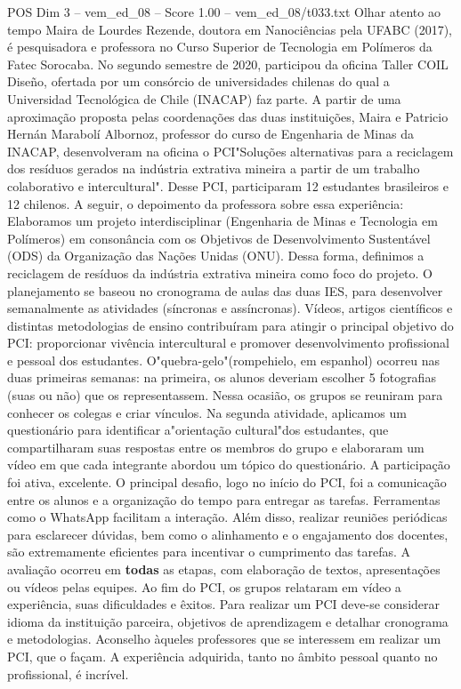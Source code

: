 \begin{textsample}{POS Dim 3 – vem\_ed\_08 – Score 1.00 – vem\_ed\_08/t033.txt}  \label{ex:f3_pos_012}
Olhar atento ao tempo Maira de Lourdes Rezende, doutora em Nanociências pela UFABC (2017), é pesquisadora e professora no Curso Superior de Tecnologia em Polímeros da Fatec Sorocaba.
No segundo semestre de 2020, participou da oficina Taller COIL Diseño, ofertada por um consórcio de universidades chilenas do qual a Universidad Tecnológica de Chile (INACAP) faz parte.
A partir de uma aproximação proposta pelas coordenações das duas instituições, Maira e Patricio Hernán Marabolí Albornoz, professor do curso de Engenharia de Minas da INACAP, desenvolveram na oficina o PCI"Soluções alternativas para a reciclagem dos resíduos gerados na indústria extrativa mineira a partir de um trabalho colaborativo e intercultural".
Desse PCI, participaram 12 estudantes brasileiros e 12 chilenos.
A seguir, o depoimento da professora sobre essa experiência: Elaboramos um projeto interdisciplinar (Engenharia de Minas e Tecnologia em Polímeros) em consonância com os Objetivos de Desenvolvimento Sustentável (ODS) da Organização das Nações Unidas (ONU).
Dessa forma, definimos a reciclagem de resíduos da indústria extrativa mineira como foco do projeto.
O planejamento se baseou no cronograma de aulas das duas IES, para desenvolver semanalmente as atividades (síncronas e assíncronas).
Vídeos, artigos científicos e distintas metodologias de ensino contribuíram para atingir o principal objetivo do PCI: proporcionar vivência intercultural e promover desenvolvimento profissional e pessoal dos estudantes.
O"quebra-gelo"(rompehielo, em espanhol) ocorreu nas duas primeiras semanas: na primeira, os alunos deveriam escolher 5 fotografias (suas ou não) que os representassem.
Nessa ocasião, os grupos se reuniram para conhecer os colegas e criar vínculos.
Na segunda atividade, aplicamos um questionário para identificar a"orientação cultural"dos estudantes, que compartilharam suas respostas entre os membros do grupo e elaboraram um vídeo em que cada integrante abordou um tópico do questionário.
A participação foi ativa, excelente.
O principal desafio, logo no início do PCI, foi a comunicação entre os alunos e a organização do tempo para entregar as tarefas.
Ferramentas como o WhatsApp facilitam a interação.
Além disso, realizar reuniões periódicas para esclarecer dúvidas, bem como o alinhamento e o engajamento dos docentes, são extremamente eficientes para incentivar o cumprimento das tarefas.
A avaliação ocorreu em \textbf{todas} as etapas, com elaboração de textos, apresentações ou vídeos pelas equipes.
Ao fim do PCI, os grupos relataram em vídeo a experiência, suas dificuldades e êxitos.
Para realizar um PCI deve-se considerar idioma da instituição parceira, objetivos de aprendizagem e detalhar cronograma e metodologias.
Aconselho àqueles professores que se interessem em realizar um PCI, que o façam.
A experiência adquirida, tanto no âmbito pessoal quanto no profissional, é incrível.

\end{textsample}
